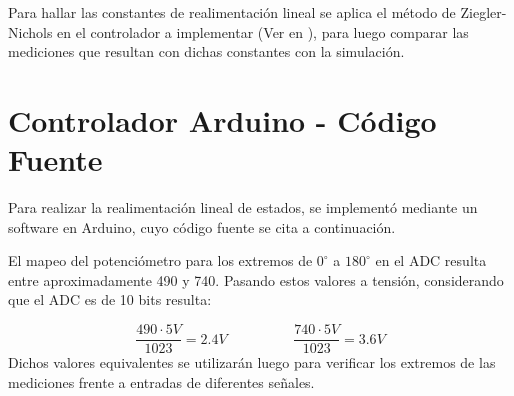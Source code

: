 \documentclass{article}
\begin{document}
Para hallar las constantes de realimentación lineal se aplica el método de Ziegler-Nichols en el controlador a implementar (Ver en ), para luego comparar las mediciones que resultan con dichas constantes con la simulación.

\newpage

\section{Controlador Arduino - Código Fuente}
Para realizar la realimentación lineal de estados, se implementó mediante un software en Arduino, cuyo código fuente se cita a continuación.\par
El mapeo del potenciómetro para los extremos de $0^{\circ}$ a $180^{\circ}$ en el ADC resulta entre aproximadamente 490 y 740. Pasando estos valores a tensión, considerando que el ADC es de 10 bits resulta:

\[
\frac{490 \cdot 5V}{1023} = 2.4V \hspace{2cm} \frac{740 \cdot 5V}{1023} = 3.6V
\]
Dichos valores equivalentes se utilizarán luego para verificar los extremos de las mediciones frente a entradas de diferentes señales.
\end{document}
